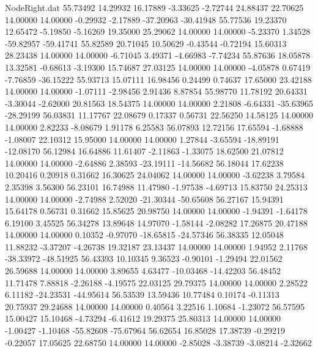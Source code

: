 \begin{filecontents}{NodeRight.dat}
  55.73492   14.29932   16.17889    -3.33625   -2.72744   24.88437   22.70625   14.00000   14.00000   -0.29932   -2.17889  -37.20963  -30.41948
  55.77536   19.23370   12.65472    -5.19850   -5.16269   19.35000   25.29062   14.00000   14.00000   -5.23370    1.34528  -59.82957  -59.41741
  55.82589   20.71045   10.50629    -0.43544   -0.72194   15.60313   28.23438   14.00000   14.00000   -6.71045    3.49371   -4.66983   -7.74234
  55.87636   18.05878   13.32581    -0.68613   -3.19300   15.74687   27.03125   14.00000   14.00000   -4.05878    0.67419   -7.76859  -36.15222
  55.93713   15.07111   16.98456     0.24499    0.74637   17.65000   23.42188   14.00000   14.00000   -1.07111   -2.98456    2.91436    8.87854
  55.98770   11.78192   20.64331    -3.30044   -2.62000   20.81563   18.54375   14.00000   14.00000    2.21808   -6.64331  -35.63965  -28.29199
  56.03831   11.17767   22.08679     0.17337    0.56731   22.56250   14.58125   14.00000   14.00000    2.82233   -8.08679    1.91178    6.25583
  56.07893   12.72156   17.65594    -1.68888   -1.08007   22.10312   15.95000   14.00000   14.00000    1.27844   -3.65594  -18.89191  -12.08170
  56.12984   16.64886   11.61407    -2.11863   -1.33075   18.62500   21.07812   14.00000   14.00000   -2.64886    2.38593  -23.19111  -14.56682
  56.18044   17.62238   10.20416     0.20918    0.31662   16.30625   24.04062   14.00000   14.00000   -3.62238    3.79584    2.35398    3.56300
  56.23101   16.74988   11.47980    -1.97538   -4.69713   15.83750   24.25313   14.00000   14.00000   -2.74988    2.52020  -21.30344  -50.65608
  56.27167   15.94391   15.64178     0.56731    0.31662   15.85625   20.98750   14.00000   14.00000   -1.94391   -1.64178    6.19100    3.45525
  56.34278   13.89648   14.97070    -1.58144   -2.08282   17.26875   20.47188   14.00000   14.00000    0.10352   -0.97070  -18.65815  -24.57346
  56.38335   12.05048   11.88232    -3.37207   -4.26738   19.32187   23.13437   14.00000   14.00000    1.94952    2.11768  -38.33972  -48.51925
  56.43393   10.10345    9.36523    -0.90101   -1.29494   22.01562   26.59688   14.00000   14.00000    3.89655    4.63477  -10.03468  -14.42203
  56.48452   11.71478    7.88818    -2.26188   -4.19575   22.03125   29.79375   14.00000   14.00000    2.28522    6.11182  -24.23531  -44.95614
  56.53539   13.59436   10.77484     0.10174   -0.11313   20.75937   29.24688   14.00000   14.00000    0.40564    3.22516    1.10684   -1.23072
  56.57595   15.00427   15.10468    -4.73294   -6.41612   19.29375   25.80313   14.00000   14.00000   -1.00427   -1.10468  -55.82608  -75.67964
  56.62654   16.85028   17.38739    -0.29219   -0.22057   17.05625   22.68750   14.00000   14.00000   -2.85028   -3.38739   -3.08214   -2.32662

\end{filecontents}
